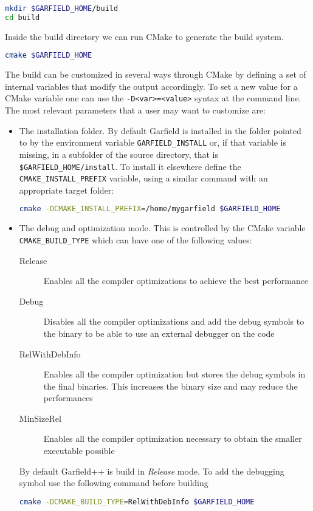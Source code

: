 \begin{lstlisting}[language=bash]
mkdir $GARFIELD_HOME/build
cd build
\end{lstlisting}

Inside the build directory we can run CMake to generate the build system.

\begin{lstlisting}[language=bash]
cmake $GARFIELD_HOME
\end{lstlisting}

The build can be customized in several ways through CMake by defining a set of internal variables that modify the output accordingly. To set a new value for a CMake variable one can use the \texttt{-D<var>=<value>} syntax at the command line. The most relevant parameters that a user may want to customize are:

\begin{itemize}
	\item The installation folder. By default Garfield is installed in the folder pointed to by the environment variable \texttt{GARFIELD\_INSTALL} or, if that variable is missing, in a subfolder of the source directory, that is \texttt{\$GARFIELD\_HOME/install}. To install it elsewhere define the \texttt{CMAKE\_INSTALL\_PREFIX} variable, using a similar command with an appropriate target folder:
\begin{lstlisting}[language=bash]
cmake -DCMAKE_INSTALL_PREFIX=/home/mygarfield $GARFIELD_HOME
\end{lstlisting} 
	\item The debug and optimization mode. This is controlled by the CMake variable \texttt{CMAKE\_BUILD\_TYPE} which can have one of the following values: 
	\begin{description}
		\item[Release] Enables all the compiler optimizations to achieve the best performance
		\item[Debug] Disables all the compiler optimizations and add the debug symbols to the binary to be able to use an external debugger on the code
		\item[RelWithDebInfo] Enables all the compiler optimization but stores the debug symbols in the final binaries. This increases the binary size and may reduce the performances
		\item[MinSizeRel] Enables all the compiler optimization necessary to obtain the smaller executable possible
	\end{description}
	By default Garfield++ is build in \emph{Release} mode. To add the debugging symbol use the following command before building
\begin{lstlisting}[language=bash]
cmake -DCMAKE_BUILD_TYPE=RelWithDebInfo $GARFIELD_HOME
\end{lstlisting}
\end{itemize}


